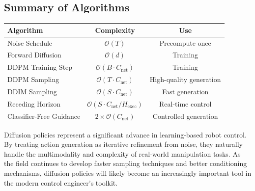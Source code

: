 \subsection{Summary of Algorithms}

\begin{center}
\begin{tabular}{lcc}
\toprule
\textbf{Algorithm} & \textbf{Complexity} & \textbf{Use} \\
\midrule
Noise Schedule & $\mathcal{O}(T)$ & Precompute once \\
Forward Diffusion & $\mathcal{O}(d)$ & Training \\
DDPM Training Step & $\mathcal{O}(B \cdot C_{\text{net}})$ & Training \\
DDPM Sampling & $\mathcal{O}(T \cdot C_{\text{net}})$ & High-quality generation \\
DDIM Sampling & $\mathcal{O}(S \cdot C_{\text{net}})$ & Fast generation \\
Receding Horizon & $\mathcal{O}(S \cdot C_{\text{net}} / H_{\text{exec}})$ & Real-time control \\
Classifier-Free Guidance & $2 \times \mathcal{O}(C_{\text{net}})$ & Controlled generation \\
\bottomrule
\end{tabular}
\end{center}

\vspace{1em}

Diffusion policies represent a significant advance in learning-based robot control. By treating action generation as iterative refinement from noise, they naturally handle the multimodality and complexity of real-world manipulation tasks. As the field continues to develop faster sampling techniques and better conditioning mechanisms, diffusion policies will likely become an increasingly important tool in the modern control engineer's toolkit.

